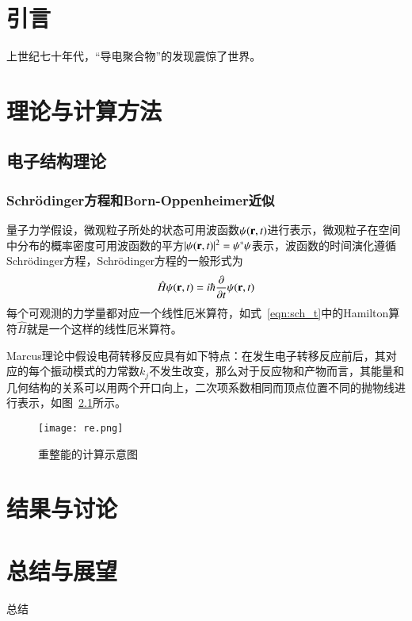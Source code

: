 
\iffalse
\fi


\chapter{引言}
上世纪七十年代，“导电聚合物”的发现震惊了世界\cite{PhysRevLett.40.1472}。

\chapter{理论与计算方法}
\vspace{2mm}
\section{电子结构理论}
\vspace{2mm}
\vspace{2mm}
\subsection{Schrödinger方程和Born-Oppenheimer近似}
\vspace{2mm}
量子力学假设，微观粒子所处的状态可用波函数$\psi({\bf r},t)$进行表示，微观粒子在空间中分布的概率密度可用波函数的平方$|\psi({\bf r},t)|^2=\psi^*\psi$表示，波函数的时间演化遵循Schrödinger方程，Schrödinger方程的一般形式为\vspace{3mm}
\begin{equation}
    \label{eqn:sch_t}
\hat H \psi ({\bf r},t)=i\hbar\frac{\partial}{\partial t}\psi({\bf r},t) \vspace{3mm}
\end{equation}
每个可观测的力学量都对应一个线性厄米算符，如式~\eqref{eqn:sch_t}中的Hamilton算符$\hat H$就是一个这样的线性厄米算符。

Marcus理论中假设电荷转移反应具有如下特点：在发生电子转移反应前后，其对应的每个振动模式的力常数$k_j$不发生改变，那么对于反应物和产物而言，其能量和几何结构的关系可以用两个开口向上，二次项系数相同而顶点位置不同的抛物线进行表示，如图~\ref{fig:re}所示。

\begin{figure}[htbp!]
    \centering
    \texttt{[image: re.png]}
    \caption{重整能的计算示意图}\label{fig:re}
    \vspace{2mm}
\end{figure}

\chapter{结果与讨论}

\chapter{总结与展望}

总结